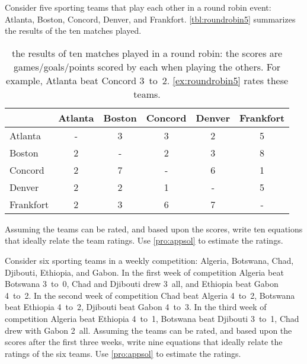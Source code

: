 \begin{exercise} \label{ex:roundrobin5} 
Consider five sporting teams that play each other in a round robin  event: Atlanta, Boston, Concord, Denver, and Frankfort.
\autoref{tbl:roundrobin5} summarizes the results of the ten matches played.
\begin{table}
\caption{the results of ten matches played in a round robin: the scores are games\slash goals\slash points scored by each when playing the others.  For example, Atlanta beat Concord 3~to~2.  \autoref{ex:roundrobin5} rates these teams.}
\label{tbl:roundrobin5}
\begin{center}
\begin{tabular}{@{}l|ccccc@{}} \hline
&Atlanta& Boston& Concord& Denver&Frankfort\\ \hline
Atlanta & - & 3 & 3 & 2 & 5 \\
Boston & 2 & - & 2 & 3 & 8 \\
Concord & 2 & 7 & - & 6 & 1 \\
Denver & 2 & 2 & 1 & - & 5 \\ 
Frankfort& 2 & 3 & 6 & 7 & - \\\hline
\end{tabular}
\end{center}
\end{table}%
Assuming the teams can be rated, and  based upon the scores, write ten equations that ideally relate the team ratings.  
Use \autoref{pro:appsol} to estimate the ratings.
\end{exercise}




\begin{exercise} \label{ex:roundrobin6} 
Consider six sporting teams in a weekly competition: Algeria, Botswana, Chad, Djibouti, Ethiopia, and Gabon.
In the first week of competition 
Algeria beat Botswana 3~to~0, 
Chad and Djibouti drew 3~all, and 
Ethiopia beat Gabon 4~to~2.
In the second week of competition 
Chad beat Algeria 4~to~2, 
Botswana beat Ethiopia 4~to~2,
Djibouti beat Gabon 4~to~3.
In the third week of competition 
Algeria beat Ethiopia 4~to~1, 
Botswana beat Djibouti 3~to~1,
Chad drew with Gabon 2~all.
Assuming the teams can be rated, and  based upon the scores after the first three weeks, write nine equations that ideally relate the ratings of the six teams.  
Use \autoref{pro:appsol} to estimate the ratings.
\end{exercise}



